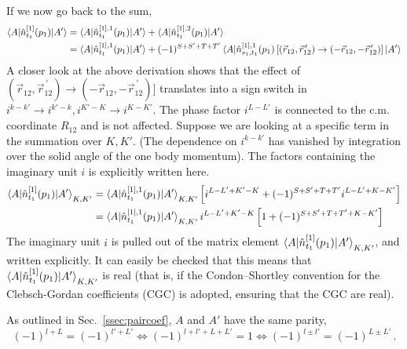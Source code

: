 \documentclass[10pt]{article}
\begin{document}
If we now go back to the sum,
\begin{align*}
	\braket{ A | \hat{n}_{t_1}^{[1]}(p_1) | A'} &= \braket{ A | \hat{n}_{t_1}^{[1],1}(p_1) | A'} + \braket{ A | \hat{n}_{t_1}^{[1],2}(p_1) | A'} \\
	&= \braket{ A | \hat{n}_{t_1}^{[1],1}(p_1) | A'} + (-1)^{S+S'+T+T'} \braket{ A | \hat{n}^{[1],1}_{s_1,t_1}(p_1) \left[ ( \vec{r}_{12}, \vec{r}_{12}^{\, \prime} ) \rightarrow ( - \vec{r}_{12}, - \vec{r}_{12}^{\, \prime} ) \right] | A'} 
\end{align*}
A closer look at the above derivation shows that the effect of $ ( \vec{r}_{12}, \vec{r}_{12}^{\, \prime} ) \rightarrow ( - \vec{r}_{12}, - \vec{r}_{12}^{\, \prime} )]$ translates into a sign switch in $i^{k-k'} \rightarrow i^{k'-k}, i^{K'-K} \rightarrow i^{K-K'}$.
The phase factor $i^{L-L'}$ is connected to the c.m. coordinate $R_{12}$ and is not affected.
Suppose we are looking at a specific term in the summation over $K,K'$. (The dependence on $i^{k-k'}$ has vanished by integration over the solid angle of the one body momentum).
The factors containing the imaginary unit $i$ is explicitly written here.
\begin{align*}
	\braket{ A | \hat{n}_{t_1}^{[1]}(p_1) | A'}_{K,K'} &= \braket{ A | \hat{n}_{t_1}^{[1],1}(p_1) | A'}_{K,K'} \left[ i^{L-L'+K'-K} + (-1)^{S+S'+T+T'} i^{L-L'+K-K'} \right] \\
	&= \braket{ A | \hat{n}_{t_1}^{[1],1}(p_1) | A'}_{K,K'} i^{L-L' + K'-K} \left[ 1 + (-1)^{S+S'+T+T'+K-K'} \right]
\end{align*}
The imaginary unit $i$ is pulled out of the matrix element $\braket{ A | \hat{n}_{t_1}^{[1]}(p_1) | A'}_{K,K'}$, and written explicitly. It can easily be checked that this means that $\braket{ A | \hat{n}_{t_1}^{[1]}(p_1) | A'}_{K,K'}$ is real (that is, if the Condon–Shortley convention for the Clebsch-Gordan coefficients (CGC) is adopted, ensuring that the CGC are real).

As outlined in Sec.~\ref{ssec:paircoef}, $A$ and $A'$ have the same parity,
\begin{equation}
	(-1)^{l+L} = (-1)^{l'+L'} \Leftrightarrow (-1)^{l+l'+L+L'} = 1 \Leftrightarrow (-1)^{l \pm l'} = (-1)^{L \pm L'}  \, .
	\label{eq:parity_phase_id}
\end{equation}
\end{document}
